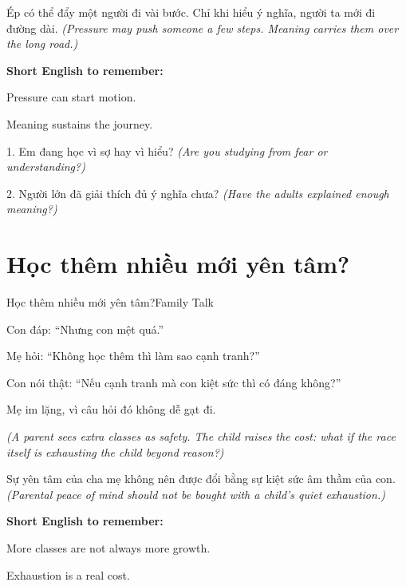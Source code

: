 \begin{baihoc}
Ép có thể đẩy một người đi vài bước. Chỉ khi hiểu ý nghĩa, người ta mới đi đường dài.
\textit{(Pressure may push someone a few steps. Meaning carries them over the long road.)}
\end{baihoc}

\begin{ghinhoanh}
\textbf{Short English to remember:}

Pressure can start motion.

Meaning sustains the journey.
\end{ghinhoanh}

\begin{tuhocnhanh}
1. Em đang học vì sợ hay vì hiểu? \textit{(Are you studying from fear or understanding?)}

2. Người lớn đã giải thích đủ ý nghĩa chưa? \textit{(Have the adults explained enough meaning?)}
\end{tuhocnhanh}
\ngancach

\section{Học thêm nhiều mới yên tâm?}
\begin{truyen}{Học thêm nhiều mới yên tâm?}{Family Talk}

Con đáp: ``Nhưng con mệt quá.''

Mẹ hỏi: ``Không học thêm thì làm sao cạnh tranh?''

Con nói thật: ``Nếu cạnh tranh mà con kiệt sức thì có đáng không?''

Mẹ im lặng, vì câu hỏi đó không dễ gạt đi.

\textit{(A parent sees extra classes as safety. The child raises the cost: what if the race itself is exhausting the child beyond reason?) }
\end{truyen}

\begin{baihoc}
Sự yên tâm của cha mẹ không nên được đổi bằng sự kiệt sức âm thầm của con.
\textit{(Parental peace of mind should not be bought with a child's quiet exhaustion.)}
\end{baihoc}

\begin{ghinhoanh}
\textbf{Short English to remember:}

More classes are not always more growth.

Exhaustion is a real cost.
\end{ghinhoanh}

